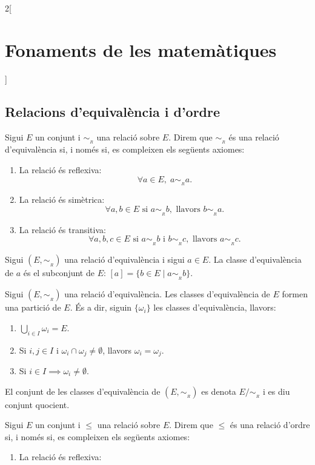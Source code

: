 \documentclass[../../../main.tex]{subfiles}
\begin{document}
\begin{multicols}{2}[\section{Fonaments de les matemàtiques}]
\subsection{Relacions d'equivalència i d'ordre}
\begin{definition}
Sigui $E$ un conjunt i $\sim_{\!_R}$ una relació sobre $E$. Direm que $\sim_{\!_R}$ és una relació d'equivalència si, i només si, es compleixen els següents axiomes:
\begin{enumerate}
    \item La relació és reflexiva:
    $$\forall a\in E,\;a\sim_{\!_R} a.$$
    \item La relació és simètrica:
    $$\forall a,b\in E\text{ si }a\sim_{\!_R} b,\text{ llavors }b\sim_{\!_R} a.$$
    \item La relació és transitiva:
    $$\forall a,b,c\in E\text{ si }a\sim_{\!_R} b\text{ i }b\sim_{\!_R} c,\text{ llavors }a\sim_{\!_R} c.$$
\end{enumerate}
\end{definition}
\begin{definition}
Sigui $(E,\sim_{\!_R})$ una relació d'equivalència i sigui $a\in E$. La classe d'equivalència de $a$ és el subconjunt de $E$: $[a]=\{b\in E\mid a\sim_{\!_R} b\}$.
\end{definition}
\begin{theorem}
Sigui $(E,\sim_{\!_R})$ una relació d'equivalència. Les classes d'equivalència de $E$ formen una partició de $E$. És a dir, siguin $\{\omega_i\}$ les classes d'equivalència, llavors:
\begin{enumerate}
    \item $\bigcup_{i\in I} \omega_i=E$.
    \item Si $i,j\in I$ i $\omega_i\cap\omega_j\ne\emptyset$, llavors $\omega_i=\omega_j$.
    \item Si $i\in I\implies\omega_i\ne\emptyset$.
\end{enumerate}
\end{theorem}
\begin{definition}
El conjunt de les classes d'equivalència de $(E,\sim_{\!_R})$ es denota $E/\sim_{\!_R}$ i es diu conjunt quocient.
\end{definition}
\begin{definition}
Sigui $E$ un conjunt i $\leq$ una relació sobre $E$. Direm que $\leq$ és una relació d'ordre si, i només si, es compleixen els següents axiomes:
\begin{enumerate}
    \item La relació és reflexiva:

\end{enumerate}
\end{definition}
\end{multicols}
\end{document}
